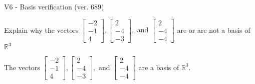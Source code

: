 \begin{exercise}
  \begin{exerciseTitle}V6 - Basis verification (ver. 689)\end{exerciseTitle}
  \begin{exerciseStatement}
    Explain why the vectors \(\left[\begin{array}{r}
-2 \\
-1 \\
4
\end{array}\right] , \left[\begin{array}{r}
2 \\
-4 \\
-3
\end{array}\right] , \text{ and } \left[\begin{array}{r}
2 \\
-4 \\
-4
\end{array}\right]\) are or are not a basis of \(\mathbb{R}^3\)	


  \end{exerciseStatement}
  \begin{exerciseAnswer}
   The vectors \(\left[\begin{array}{r}
-2 \\
-1 \\
4
\end{array}\right] , \left[\begin{array}{r}
2 \\
-4 \\
-3
\end{array}\right] , \text{ and } \left[\begin{array}{r}
2 \\
-4 \\
-4
\end{array}\right]\) 
  	 are  a basis of \(\mathbb{R}^3\).
  


  \end{exerciseAnswer}
\end{exercise}
